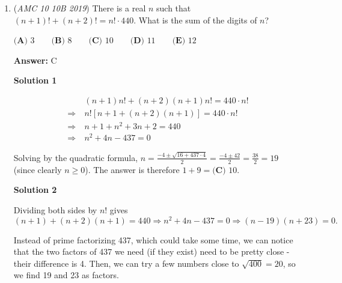 \begin{enumerate}
 Thus the answer is $\boxed{\textbf{(E)}}$.

 \textbf{Counterexamples} If $(x_1,y_1) = (2,3)$ and $(x_2,y_2) = (7,1)$, then the slope of $AB$, $m_{AB}$, is $\frac{1 - 3}{7 - 2} = -\frac{2}{5}$, while the slope of $A'B'$, $m_{A'B'}$, is $\frac{7 - 2}{1 - 3} = -\frac{5}{2}$. $m_{A'B'}$ is the \textbf{reciprocal} of $m_{AB}$, but it is not the negative reciprocal of $m_{AB}$. To generalize, let $(x_1,y_1)$ denote the coordinates of point $A$, let $(x_2, y_2)$ denote the coordinates of point $B$, let $m_{AB}$ denote the slope of segment $\overline{AB}$, and let $m_{A'B'}$ denote the slope of segment $\overline{A'B'}$. Then, the coordinates of $A'$ are $(y_1, x_1)$, and of $B'$ are $(y_2, x_2)$. Then, $m_{AB} = \frac{y_2 - y_1}{x_2 - x_1}$, and $m_{A'B'} = \frac{x_2 - x_1}{y_2 - y_1} = \frac{1}{m_{AB}}$, so slopes arent negative reciprocals of each other.

 


	\item (\textit{AMC 10 10B 2019}) There is a real $n$ such that $(n+1)! + (n+2)! = n! \cdot 440$. What is the sum of the digits of $n$?


 $\textbf{(A) }3\qquad\textbf{(B) }8\qquad\textbf{(C) }10\qquad\textbf{(D) }11\qquad\textbf{(E) }12$

 \textbf{Answer: }C



\textbf{Solution 1}


 \[\begin{split}& (n+1)n! + (n+2)(n+1)n! = 440 \cdot n! \\ \Rightarrow \ &n![n+1 + (n+2)(n+1)] = 440 \cdot n! \\ \Rightarrow \ &n + 1 + n^2 + 3n + 2 = 440 \\ \Rightarrow \ &n^2 + 4n - 437 = 0\end{split}\]

 Solving by the quadratic formula, $n = \frac{-4\pm \sqrt{16+437\cdot4}}{2} = \frac{-4\pm 42}{2} = \frac{38}{2} = 19$ (since clearly $n \geq 0$). The answer is therefore $1 + 9 = \boxed{\textbf{(C) }10}$.

 



\textbf{Solution 2}

Dividing both sides by $n!$ gives
 \[(n+1)+(n+2)(n+1)=440 \Rightarrow n^2+4n-437=0 \Rightarrow (n-19)(n+23)=0.\]

 Instead of prime factorizing 437, which could take some time, we can notice that the two factors of 437 we need (if they exist) need to be pretty close - their difference is 4. Then, we can try a few numbers close to $\sqrt{400} = 20$, so we find 19 and 23 as factors.


\end{enumerate}

